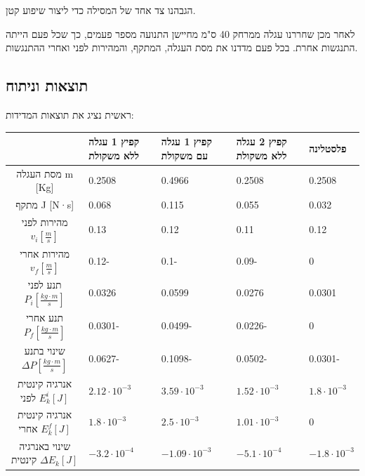 \documentclass[14pt]{extarticle}
\begin{document}
הגבהנו צד אחד של המסילה כדי ליצור שיפוע קטן.

לאחר מכן שחררנו עגלה ממרחק 40 ס"מ מחיישן התנועה מספר פעמים, כך שכל פעם הייתה התנגשות אחרת. בכל פעם מדדנו  את מסת העגלה, המתקף, והמהירות  לפני  ואחרי ההתנגשות.

\subsection*{תוצאות וניתוח}

ראשית נציג את תוצאות המדידות:

\begin{table}[H]
    \centering
    \begin{tabular}{|c|p{2cm}|p{2cm}|p{2cm}|p{2cm}|}
        \hline
                                                      & קפיץ 1 עגלה ללא משקולת & קפיץ 1 עגלה עם משקולת  & קפיץ 2 עגלה ללא משקולת & פלסטלינה              \\
        \hline
        מסת העגלה m [Kg]                              & 0.2508                 & 0.4966                 & 0.2508                 & 0.2508                \\
        \hline
        מתקף J [N·s]                                  & 0.068                  & 0.115                  & 0.055                   & 0.032                  \\
        \hline
        מהירות לפני $v_i [\frac{m}{s}]$               & 0.13                   & 0.12                   & 0.11                   & 0.12                  \\
        \hline
        מהירות אחרי $v_f [\frac{m}{s}]$               & 0.12-                  & 0.1-                   & 0.09-                  & 0                     \\
        \hline
        תנע לפני $P_i [\frac{kg \cdot m}{s}]$         & 0.0326                 & 0.0599                 & 0.0276                 & 0.0301                \\
        \hline
        תנע אחרי $P_f [\frac{kg \cdot m}{s}]$         & 0.0301-                & 0.0499-                & 0.0226-                & 0                     \\
        \hline
        שינוי בתנע  $\Delta P [\frac{kg \cdot m}{s}]$ & 0.0627-                & 0.1098-                & 0.0502-                & 0.0301-               \\
        \hline
        אנרגיה קינטית לפני $E_k^i [J]$                & $2.12 \cdot 10^{-3}$   & $3.59 \cdot 10^{-3}$   & $1.52 \cdot 10^{-3}$   & $1.8 \cdot 10^{-3}$   \\
        \hline
        אנרגיה קינטית אחרי $E_k^f [J]$                & $1.8 \cdot 10^{-3}$    & $2.5 \cdot 10^{-3}$    & $1.01 \cdot 10^{-3}$   & 0                     \\
        \hline
        שינוי באנרגיה קינטית $\Delta E_k [J]$         & $-3.2 \cdotp 10^{-4}$  & $-1.09 \cdotp 10^{-3}$ & $-5.1 \cdotp 10^{-4}$  & $-1.8 \cdotp 10^{-3}$ \\
        \hline
    \end{tabular}
\end{table}
\end{document}
